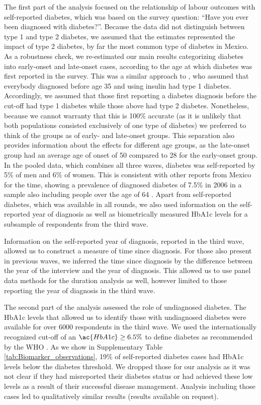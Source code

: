 \documentclass[12pt,english]{article}
\begin{document}
The first part of the analysis focused on the relationship of labour outcomes with self-reported diabetes, which was based on the survey question: “Have you ever been diagnosed with diabetes?”. Because the data did not distinguish between type 1 and type 2 diabetes, we assumed that the estimates represented the impact of type 2 diabetes, by far the most common type of diabetes in Mexico. As a robustness check, we re-estimated our main results categorizing diabetes into early-onset and late-onset cases, according to the age at which diabetes was first reported in the survey. This was a similar approach to \textcite{Alegre-Diaz2016}, who assumed that everybody diagnosed before age 35 and using insulin had type 1 diabetes. Accordingly, we assumed that those first reporting a diabetes diagnosis before the cut-off had type 1 diabetes while those above had type 2 diabetes. Nonetheless, because we cannot warranty that this is 100\% accurate (as it is unlikely that both populations consisted exclusively of one type of diabetes) we preferred to think of the groups as of early- and late-onset groups. This separation also provides information about the effects for different age groups, as the late-onset group had an average age of onset of 50 compared to 28 for the early-onset group. In the pooled data, which combines all three waves, diabetes was self-reported by 5\% of men and 6\% of women. This is consistent with other reports from Mexico for the time, showing a prevalence of diagnosed diabetes of 7.5\% in 2006 in a sample also including people over the age of 64 \parencite{Barquera2013}. Apart from self-reported diabetes, which was available in all rounds, we also used information on the self-reported year of diagnosis as well as biometrically measured \ac{HbA1c} levels for a subsample of respondents from the third wave.


Information on the self-reported year of diagnosis, reported in the third wave, allowed us to construct a measure of time since diagnosis. For those also present in previous waves, we inferred the time since diagnosis by the difference between the year of the interview and the year of diagnosis. This allowed us to use panel data methods for the duration analysis as well, however limited to those reporting the year of diagnosis in the third wave. 

The second part of the analysis assessed the role of undiagnosed diabetes. The \ac{HbA1c} levels that allowed us to identify those with undiagnosed diabetes were available for over 6000 respondents in the third wave. We used the internationally recognized cut-off of an $\ac{HbA1c} \geq 6.5\%$ to define diabetes as recommended by the \ac{WHO} \parencite{WorldHealthOrganization2011}.  As we show in Supplementary Table \ref{tab:Biomarker_observations}, 19\% of self-reported diabetes cases had \ac{HbA1c} levels below the diabetes threshold. We dropped those for our analysis as it was not clear if they had misreported their diabetes status or had achieved these low levels as a result of their successful disease management. Analysis including those cases led to qualitatively similar results (results available on request).
\end{document}
